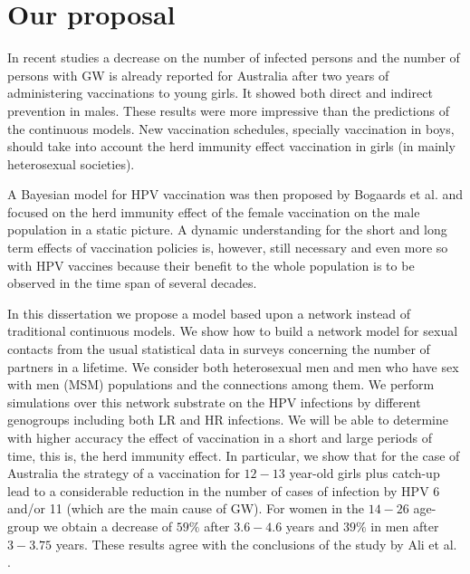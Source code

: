 \section{Our proposal}

In recent studies \cite{ali2013genital,fairley2009rapid} a decrease on the number of infected persons and the number of persons with GW is already reported for Australia after two years of administering vaccinations to young girls. It showed both direct and indirect prevention in males. These results were more impressive than the predictions of the continuous models. New vaccination schedules, specially vaccination in boys, should take into account the herd immunity effect vaccination in girls (in mainly heterosexual societies). 

A Bayesian model for HPV vaccination was then proposed by Bogaards et al. \cite{bogaards2015direct} and focused on the herd immunity effect of the female vaccination on the male population in a static picture. A dynamic understanding for the short and long term effects of vaccination policies is, however, still necessary and even more so with HPV vaccines because their benefit to the whole population is to be observed in the time span of several decades.

In this dissertation we propose a model based upon a network instead of traditional continuous models. We show how to build a network model for sexual contacts from the usual statistical data in surveys concerning the number of partners in a lifetime. We consider both heterosexual men and men who have sex with men (MSM) populations and the connections among them. We perform simulations over this network substrate on the HPV infections by different genogroups including both LR and HR infections. We will be able to determine with higher accuracy the effect of vaccination in a short and large periods of time, this is, the herd immunity effect. In particular, we show that for the case of Australia the strategy of a vaccination for $12-13$ year-old girls plus catch-up lead to a considerable reduction in the number of cases of infection by HPV 6 and/or 11 (which are the main cause of GW). For women in the $14-26$ age-group we obtain a decrease of $59\%$ after $3.6-4.6$ years and $39\%$ in men after $3-3.75$ years. These results agree with the conclusions of the study by Ali et al. \cite{ali2013genital}.

